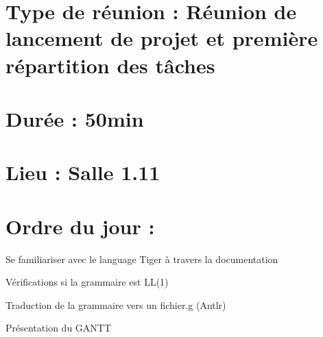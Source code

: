 \documentclass[11pt]{meetingmins}
\begin{document}
    \maketitle
    \section{Type de réunion : \textnormal{Réunion de lancement de projet et première répartition des tâches} }
    
    \section{Durée : \textnormal{50min} }
    \section{Lieu : \textnormal{ Salle 1.11} }
    
    
    \section{}
    \section{Ordre du jour :}
    \begin{hiddenitems}
    \item
    Se familiariser avec le language Tiger à travers la documentation
    \item
    Vérifications si la grammaire est LL(1)
    \item
    Traduction de la grammaire vers un fichier.g (Antlr) 
    \item
    Présentation du GANTT
    \item
    \end{hiddenitems}
    
\end{document}
